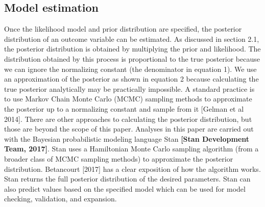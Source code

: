 \documentclass{article}
\begin{document}
\subsection{Model estimation}
Once the likelihood model and prior distribution are specified, the posterior distribution of an outcome variable can be estimated. As discussed in section 2.1, the posterior distribution is obtained by multiplying the prior and likelihood. The distribution obtained by this process is proportional to the true posterior because we can ignore the normalizing constant (the denominator in equation 1). We use an approximation of the posterior as shown in equation 2 because calculating the true posterior analytically may be practically impossible.  A standard practice is to use Markov Chain Monte Carlo (MCMC) sampling methods to approximate the posterior up to a normalizing constant and sample from it [Gelman et al 2014]. There are  other approaches to calculating the posterior distribution, but those are beyond the scope of this paper. Analyses in this paper are carried out with the Bayesian probabilistic modeling language Stan \textbf{[Stan Development Team, 2017]}. Stan uses a Hamiltonian Monte Carlo sampling algorithm (from a broader class of MCMC sampling methods) to approximate the posterior distribution. Betancourt [2017] has a clear exposition of how the algorithm works. Stan returns the full posterior distribution of the desired parameters. Stan can also predict values based on the specified model which can be used for model checking, validation, and expansion.
\end{document}
